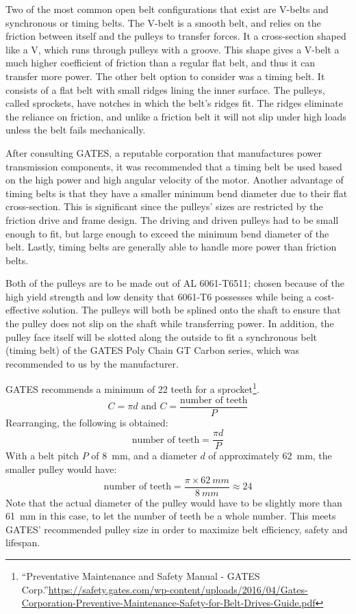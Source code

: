 \documentclass[main.tex]{subfiles}
\begin{document}
Two of the most common open belt configurations that exist are V-belts and synchronous or timing belts. The V-belt is a smooth belt, and relies on the friction between itself and the pulleys to transfer forces. It a cross-section shaped like a V, which runs through pulleys with a groove. This shape gives a V-belt a much higher coefficient of friction than a regular flat belt, and thus it can transfer more power. The other belt option to consider was a timing belt. It consists of a flat belt with small ridges lining the inner surface. The pulleys, called sprockets, have notches in which the belt's ridges fit. The ridges eliminate the reliance on friction, and unlike a friction belt it will not slip under high loads unless the belt fails mechanically.

After consulting GATES, a reputable corporation that manufactures power transmission components, it was recommended that a timing belt be used based on the high power and high angular velocity of the motor. Another advantage of timing belts is that they have a smaller minimum bend diameter due to their flat cross-section. This is significant since the pulleys' sizes are restricted by the friction drive and frame design. The driving and driven pulleys had to be small enough to fit, but large enough to exceed the minimum bend diameter of the belt. Lastly, timing belts are generally able to handle more power than friction belts. 

Both of the pulleys are to be made out of AL 6061-T6511; chosen because of the high yield strength and low density that 6061-T6 possesses while being a cost-effective solution. The pulleys will both be splined onto the shaft to ensure that the pulley does not slip on the shaft while transferring power. In addition, the pulley face itself will be slotted along the outside to fit a synchronous belt (timing belt) of the GATES Poly Chain GT Carbon series, which was recommended to us by the manufacturer.

GATES recommends a minimum of 22 teeth for a sprocket\footnote{``Preventative Maintenance and Safety Manual - GATES Corp.''\url{https://safety.gates.com/wp-content/uploads/2016/04/Gates-Corporation-Preventive-Maintenance-Safety-for-Belt-Drives-Guide.pdf}}. 
\begin{equation}
C = \pi d \textrm{ and } C=\frac{\textrm{number of teeth}}{P}
\end{equation}
Rearranging, the following is obtained:
\begin{equation}
\textrm{number of teeth}=\frac{\pi d}{P}
\end{equation}
With a belt pitch $P$ of \SI{8}{mm}, and a diameter $d$ of approximately \SI{62}{mm}, the smaller pulley would have:
\begin{equation}
\textrm{number of teeth}=\frac{\pi \times \SI{62}{mm}}{\SI{8}{mm}}\approx 24
\end{equation}
Note that the actual diameter of the pulley would have to be slightly more than \SI{61}{mm} in this case, to let the number of teeth be a whole number.
This meets GATES' recommended pulley size in order to maximize belt efficiency, safety and lifespan.
\end{document}
